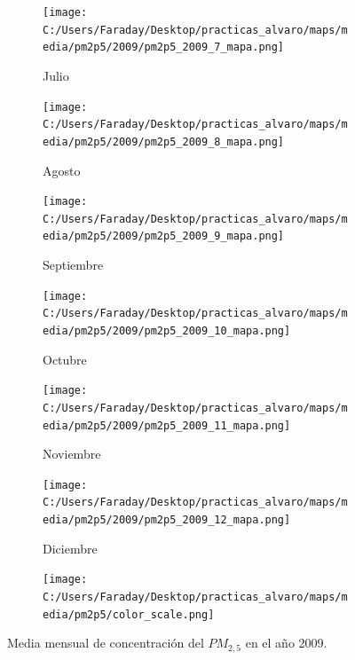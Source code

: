 \documentclass[12pt]{article}
\begin{document}
\begin{figure}[H]
\begin{subfigure}[H]{0.15\textwidth}
\texttt{[image: C:/Users/Faraday/Desktop/practicas\_alvaro/maps/media/pm2p5/2009/pm2p5\_2009\_7\_mapa.png]}
\captionsetup{labelformat=empty}
\caption{Julio}
\label{fig:map-pm2p5-2009-7}
\end{subfigure}
%
\begin{subfigure}[H]{0.15\textwidth}
\texttt{[image: C:/Users/Faraday/Desktop/practicas\_alvaro/maps/media/pm2p5/2009/pm2p5\_2009\_8\_mapa.png]}
\captionsetup{labelformat=empty}
\caption{Agosto}
\label{fig:map-pm2p5-2009-8}
\end{subfigure}
%
\begin{subfigure}[H]{0.15\textwidth}
\texttt{[image: C:/Users/Faraday/Desktop/practicas\_alvaro/maps/media/pm2p5/2009/pm2p5\_2009\_9\_mapa.png]}
\captionsetup{labelformat=empty}
\caption{Septiembre}
\label{fig:map-pm2p5-2009-9}
\end{subfigure}
%
\begin{subfigure}[H]{0.15\textwidth}
\texttt{[image: C:/Users/Faraday/Desktop/practicas\_alvaro/maps/media/pm2p5/2009/pm2p5\_2009\_10\_mapa.png]}
\captionsetup{labelformat=empty}
\caption{Octubre}
\label{fig:map-pm2p5-2009-10}
\end{subfigure}
%
\begin{subfigure}[H]{0.15\textwidth}
\texttt{[image: C:/Users/Faraday/Desktop/practicas\_alvaro/maps/media/pm2p5/2009/pm2p5\_2009\_11\_mapa.png]}
\captionsetup{labelformat=empty}
\caption{Noviembre}
\label{fig:map-pm2p5-2009-11}
\end{subfigure}
%
\begin{subfigure}[H]{0.15\textwidth}
\texttt{[image: C:/Users/Faraday/Desktop/practicas\_alvaro/maps/media/pm2p5/2009/pm2p5\_2009\_12\_mapa.png]}
\captionsetup{labelformat=empty}
\caption{Diciembre}
\label{fig:map-pm2p5-2009-12}
\end{subfigure}

\begin{subfigure}[H]{0.45\textwidth}
\texttt{[image: C:/Users/Faraday/Desktop/practicas\_alvaro/maps/media/pm2p5/color\_scale.png]}
\captionsetup{labelformat=empty}
\caption{}
\end{subfigure}

\vspace*{-7mm}
\caption{Media mensual de concentración del $PM_{2,5}$ en el año 2009.}
\label{fig:map-pm2p5-2009}
\end{figure}
\end{document}
